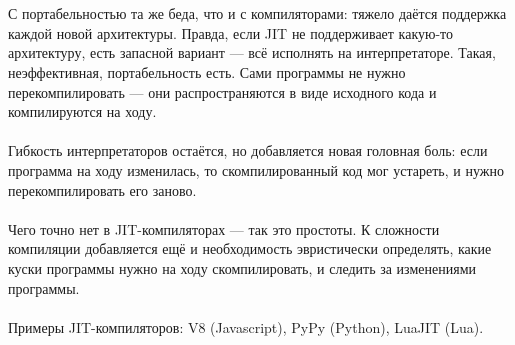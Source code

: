 \documentclass[11pt]{book}
\begin{document}
\\ \\
С портабельностью та же беда, что и с компиляторами: тяжело даётся поддержка каждой новой архитектуры.
Правда, если JIT не поддерживает какую-то архитектуру, есть запасной вариант --- всё исполнять на интерпретаторе.
Такая, неэффективная, портабельность есть.
Сами программы не нужно перекомпилировать --- они распространяются в виде исходного кода и компилируются на ходу.
\\ \\
Гибкость интерпретаторов остаётся,
но добавляется новая головная боль: если программа на ходу изменилась,
то скомпилированный код мог устареть, и нужно перекомпилировать его заново.
\\ \\
Чего точно нет в JIT-компиляторах --- так это простоты.
К сложности компиляции добавляется ещё и необходимость эвристически определять,
какие куски программы нужно на ходу скомпилировать, и следить за изменениями программы.
\\ \\
Примеры JIT-компиляторов: V8 (Javascript), PyPy (Python), LuaJIT (Lua).
\end{document}
